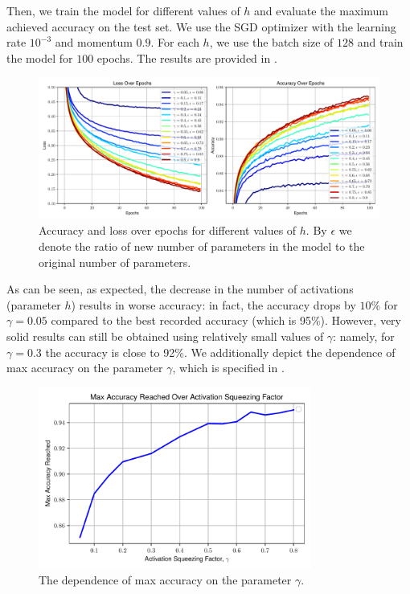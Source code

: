 \documentclass[12pt,a4paper,oneside]{book}
\theoremstyle{dplplain}
\theoremstyle{dpldefinition}
\theoremstyle{dplremark}
\begin{document}
Then, we train the model for different values of $h$ and evaluate the maximum
achieved accuracy on the test set. We use the SGD optimizer with the 
learning rate $10^{-3}$ and momentum $0.9$. For each $h$, we use 
the batch size of $128$ and train the model for $100$ epochs. The results are
provided in .

\begin{figure}[H]
    \centering
    \includegraphics[width=\textwidth]{../code/images/accuracy_loss_over_epochs_3.pdf}
    \caption{Accuracy and loss over epochs for different values of $h$. By 
    $\epsilon$ we denote the ratio of new number of parameters in the model 
    to the original number of parameters.}
    \label{figure:results}
\end{figure}

As can be seen, as expected, the decrease in the number of activations
(parameter $h$) results in worse accuracy: in fact, the accuracy drops by $10\%$
for $\gamma=0.05$ compared to the best recorded accuracy (which is 95\%).
However, very solid results can still be obtained using relatively small values
of $\gamma$: namely, for $\gamma=0.3$ the accuracy is close to 92\%. We 
additionally depict the dependence of max accuracy on the parameter $\gamma$, 
which is specified in .

\begin{figure}
    \centering
    \includegraphics[width=0.8\textwidth]{../code/images/max_accuracy_over_squeeze.pdf}
    \caption{The dependence of max accuracy on the parameter $\gamma$.}
    \label{fig:accuracies}
\end{figure}
\end{document}
